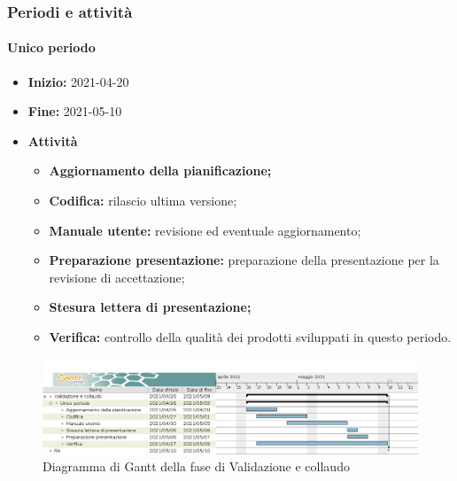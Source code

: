 \subsubsection{Periodi e attività}

\paragraph[Unico periodo]{Unico periodo}
\begin{itemize}
    \item [] \textbf{Inizio:} 2021-04-20
    \item [] \textbf{Fine:} 2021-05-10
    \item [] \textbf{Attività}
          \begin{itemize}
              \item \textbf{Aggiornamento della pianificazione;}
              \item \textbf{Codifica:} rilascio ultima versione;
              \item \textbf{Manuale utente:} revisione ed eventuale aggiornamento;
              \item \textbf{Preparazione presentazione:} preparazione della presentazione per la revisione di accettazione;
              \item \textbf{Stesura lettera di presentazione;}
              \item \textbf{Verifica:} controllo della qualità dei prodotti sviluppati in questo periodo.
          \end{itemize}
\end{itemize}

\begin{figure}[H]
    \centering
    \includegraphics[width=1\linewidth]{res/images/pianificazione/validazione_e_collaudo.png}
    \caption{Diagramma di Gantt della fase di Validazione e collaudo}
    \label{fig:_Gantt Validazione e collaudo}
\end{figure}

